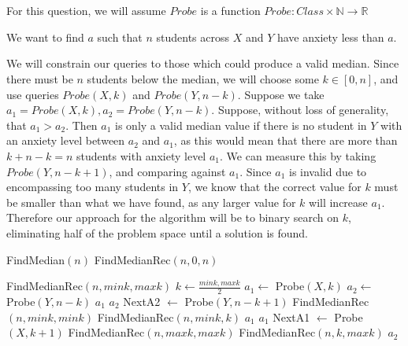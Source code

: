 \documentclass[11pt]{article}
\begin{document}
\section{}
For this question, we will assume $Probe$ is a function $Probe: Class \times \mathbb{N} \rightarrow \mathbb{R}$

We want to find $a$ such that $n$ students across $X$ and $Y$ have anxiety less than $a$.

We will constrain our queries to those which could produce a valid median. Since there must be $n$ students below the median, we will choose some $k \in [0,n]$, and use queries $Probe(X, k)$ and $Probe(Y, n-k)$. 
Suppose we take $a_1 = Probe(X, k), a_2 = Probe(Y, n-k)$. Suppose, without loss of generality, that $a_1 > a_2$. Then $a_1$ is only a valid median value if there is no student in $Y$ with an anxiety level between $a_2$ and $a_1$, as this would mean that there are more than $k + n-k = n$ students with anxiety level $a_1$. We can measure this by taking $Probe(Y, n-k+1)$, and comparing against $a_1$. Since $a_1$ is invalid due to encompassing too many students in $Y$, we know that the correct value for $k$ must be smaller than what we have found, as any larger value for $k$ will increase $a_1$. Therefore our approach for the algorithm will be to binary search on $k$, eliminating half of the problem space until a solution is found.


\begin{algorithmic}[H]
    \State FindMedian$(n)$
        \Return FindMedianRec$(n, 0, n)$

    \State FindMedianRec$(n, mink, maxk)$
        \State $k \gets \frac{mink, maxk}{2}$
        \State $a_1 \gets $ Probe$(X, k)$
        \State $a_2 \gets $ Probe$(Y, n-k)$
            \State \Return $a_1$
             
                \State \Return $a_2$
            \EndIf
            \State NextA2 $\gets$ Probe$(Y, n-k+1)$
             
                 
                    \State \Return FindMedianRec$(n, mink, mink)$
                \Else
                    \State \Return FindMedianRec$(n, mink, k)$
                \EndIf
            \Else {}
                \State \Return $a_1$
            \EndIf 
        \Else 
             
                \State \Return $a_1$
            \EndIf 
            \State NextA1 $\gets$ Probe$(X, k+1)$
             
                 
                    \State \Return FindMedianRec$(n, maxk, maxk)$
                \Else 
                    \State \Return FindMedianRec$(n, k, maxk)$
                \EndIf
            \Else {}
                \State \Return $a_2$
            \EndIf 
        \EndIf
\end{algorithmic}
\end{document}

